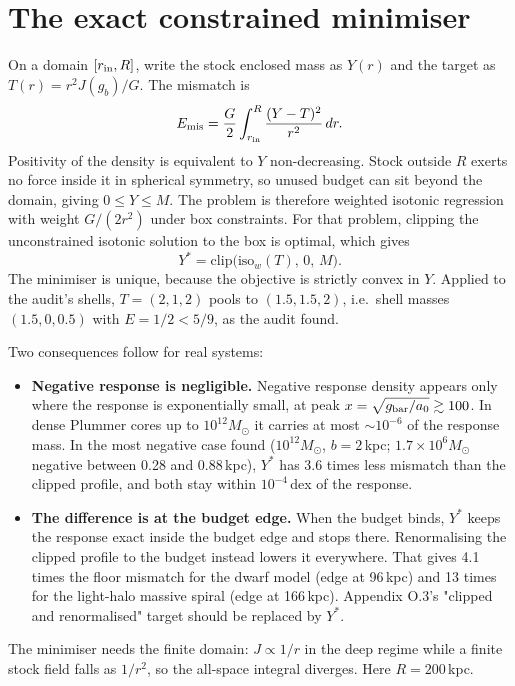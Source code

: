 \section{The exact constrained minimiser}
On a domain $[r_{\rm in},R]$, write the stock enclosed mass as $Y(r)$ and the target as $T(r)=r^2J(g_b)/G$. The mismatch is
\begin{equation}
E_{\rm mis}=\frac{G}{2}\int_{r_{\rm in}}^{R}\frac{(Y-T)^2}{r^2}\,dr .
\end{equation}
Positivity of the density is equivalent to $Y$ non-decreasing. Stock outside $R$ exerts no force inside it in spherical symmetry, so unused budget can sit beyond the domain, giving $0\le Y\le M$. The problem is therefore weighted isotonic regression with weight $G/(2r^2)$ under box constraints. For that problem, clipping the unconstrained isotonic solution to the box is optimal, which gives
\begin{equation}
Y^\ast=\mathrm{clip}\big(\mathrm{iso}_w(T),\,0,\,M\big).
\end{equation}
The minimiser is unique, because the objective is strictly convex in $Y$. Applied to the audit's shells, $T=(2,1,2)$ pools to $(1.5,1.5,2)$, i.e.\ shell masses $(1.5,0,0.5)$ with $E=1/2<5/9$, as the audit found.

Two consequences follow for real systems:
\begin{itemize}
\item \textbf{Negative response is negligible.} Negative response density appears only where the response is exponentially small, at peak $x=\sqrt{g_{\rm bar}/a_0}\gtrsim100$. In dense Plummer cores up to $10^{12}M_\odot$ it carries at most $\sim10^{-6}$ of the response mass. In the most negative case found ($10^{12}M_\odot$, $b=2$\,kpc; $1.7\times10^6M_\odot$ negative between 0.28 and 0.88\,kpc), $Y^\ast$ has 3.6 times less mismatch than the clipped profile, and both stay within $10^{-4}$\,dex of the response.
\item \textbf{The difference is at the budget edge.} When the budget binds, $Y^\ast$ keeps the response exact inside the budget edge and stops there. Renormalising the clipped profile to the budget instead lowers it everywhere. That gives 4.1 times the floor mismatch for the dwarf model (edge at 96\,kpc) and 13 times for the light-halo massive spiral (edge at 166\,kpc). Appendix O.3's "clipped and renormalised" target should be replaced by $Y^\ast$.
\end{itemize}
The minimiser needs the finite domain: $J\propto1/r$ in the deep regime while a finite stock field falls as $1/r^2$, so the all-space integral diverges. Here $R=200$\,kpc.

